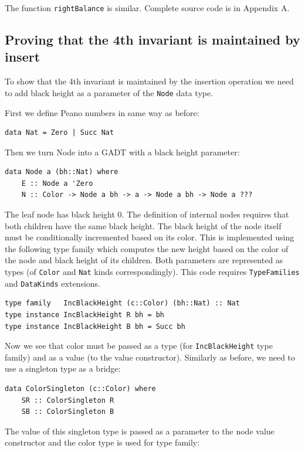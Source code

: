\documentclass{tmr}
\begin{document}
The function \verb|rightBalance| is similar. Complete source code is in Appendix A.

\subsection{Proving that the 4th invariant is maintained by insert}

To show that the 4th invariant is maintained by the insertion operation we need to add black height as a parameter of the \verb|Node| data type.

First we define Peano numbers in same way as before:

\begin{Verbatim}
data Nat = Zero | Succ Nat
\end{Verbatim}

Then we turn Node into a GADT with a black height parameter:

\begin{Verbatim}
data Node a (bh::Nat) where
    E :: Node a 'Zero
    N :: Color -> Node a bh -> a -> Node a bh -> Node a ???
\end{Verbatim}

The leaf node has black height $0$. The definition of internal nodes requires that both children have the same black height. The black height of the node itself must be conditionally incremented based on its color. This is implemented using the following type family which computes the new height based on the color of the node and black height of its children. Both parameters are represented as types (of \verb|Color| and \verb|Nat| kinds correspondingly). This code requires \verb|TypeFamilies| and \verb|DataKinds| extensions.

\begin{Verbatim}
type family   IncBlackHeight (c::Color) (bh::Nat) :: Nat
type instance IncBlackHeight R bh = bh
type instance IncBlackHeight B bh = Succ bh
\end{Verbatim}

Now we see that color must be passed as a type (for \verb|IncBlackHeight| type family) and as a value (to the value constructor). Similarly as before, we need to use a singleton type as a bridge:

\begin{Verbatim}
data ColorSingleton (c::Color) where
    SR :: ColorSingleton R
    SB :: ColorSingleton B
\end{Verbatim}

The value of this singleton type is passed as a parameter to the node value constructor and the color type is used for type family:
\end{document}
